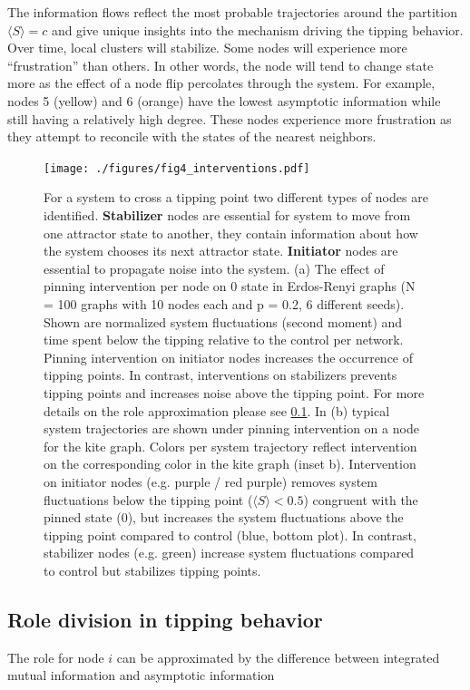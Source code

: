 \documentclass[a4paper, 11pt, twocolumn]{article}
\begin{document}
The information flows reflect the most probable trajectories
around the partition \(\langle S \rangle  = c\) and give unique insights
into the mechanism driving  the tipping behavior. Over time,
local clusters  will stabilize.  Some nodes  will experience
more  ``frustration'' than  others. In  other words,  the node
will tend to change state more  as the effect of a node flip
percolates through the system. For example, nodes 5 (yellow)
and 6 (orange) have  the lowest asymptotic information while
still  having   a  relatively   high  degree.   These  nodes
experience  more frustration  as they  attempt to  reconcile
with the states of the nearest neighbors.

\begin{figure}
\centering
\texttt{[image: ./figures/fig4\_interventions.pdf]}
\caption{\label{fig:interventions}For a system to cross a tipping point two different types of nodes are identified. \textbf{Stabilizer} nodes are essential for system to move from one attractor state to another, they contain information about  how the system chooses its next attractor state. \textbf{Initiator} nodes are essential to propagate noise into the system. (a) The effect of pinning intervention per node on 0 state  in Erdos-Renyi graphs (N = 100 graphs with 10 nodes each and p = 0.2, 6 different seeds). Shown are normalized system fluctuations (second moment) and time spent below the tipping relative to the control per network. Pinning intervention on initiator nodes increases the occurrence of tipping points. In contrast, interventions on stabilizers prevents tipping points and increases noise above the tipping point. For more details on the role approximation please see \ref{sec:roles}. In (b) typical system trajectories are shown under pinning intervention on a node for the kite graph. Colors per system trajectory reflect intervention on the corresponding color in the kite graph (inset b). Intervention on initiator nodes (e.g. purple / red purple) removes system fluctuations below the tipping point (\(\langle S \rangle < 0.5\)) congruent with the pinned state (0), but increases the system fluctuations above the tipping point compared to control (blue, bottom plot). In contrast, stabilizer nodes (e.g. green) increase system fluctuations compared to control but stabilizes tipping points.}
\end{figure}


\subsection{Role division in tipping behavior}
\label{sec:roles}
The role for node \(i\)  can be approximated by the difference
between   integrated  mutual   information  and   asymptotic
information
\end{document}
